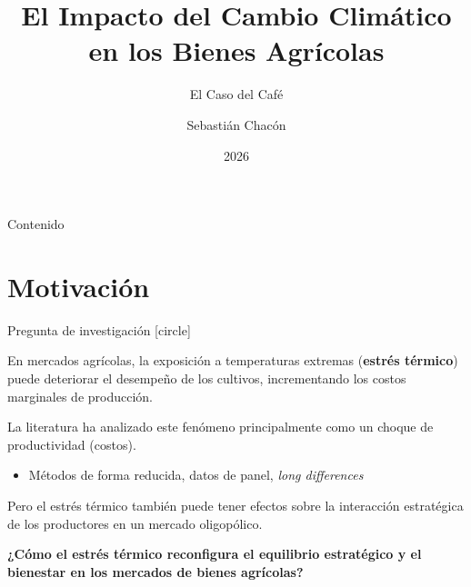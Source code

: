 

\usepackage{sty/personalmacros}
\usepackage{sty/personalslides}

\usepackage{pifont}
\usepackage{multicol}
\usepackage{graphicx}
\usepackage{caption}
\usepackage{subcaption}
\usepackage{booktabs}

\usepackage{amssymb}
\usepackage{amsthm}
\usepackage{bbm}

\usepackage[spanish]{babel}
\usepackage{caption}
\captionsetup[table]{name=Tabla}
\captionsetup[figure]{name=Figura}

\newenvironment{wideitemize}{\itemize\addtolength{\itemsep}{10pt}}{\enditemize}

\title{{\color{yaleblue}\textbf{El Impacto del Cambio Climático en los Bienes Agrícolas}}}
\subtitle{\color{yaleblue}El Caso del Café}
\date{2026}
\author[Chacón]{\small Sebastián Chacón\inst{*}}


\maketitle

\begin{frame}{Contenido}
\color{yaleblue}
\tableofcontents
\end{frame}
\section{Motivación}
\begin{frame}{Pregunta de investigación}
    [circle]
    \begin{wideitemize}
        \item <1-> En mercados agrícolas, la exposición a temperaturas extremas (\textbf{estrés térmico}) puede deteriorar el desempeño de los cultivos, incrementando los costos marginales de producción.
        
        \item <2-> La literatura ha analizado este fenómeno principalmente como un choque de productividad (costos).
        \begin{itemize}
            \item Métodos de forma reducida, datos de panel, \textit{long differences}
        \end{itemize}
        \item <3-> Pero el estrés térmico también puede tener efectos sobre la interacción estratégica de los productores en un mercado oligopólico.

        \item <4-> \textbf{\color{amaranth} ¿Cómo el estrés térmico reconfigura el equilibrio estratégico y el bienestar en los mercados de bienes agrícolas?}
    \end{wideitemize}
\end{frame}

